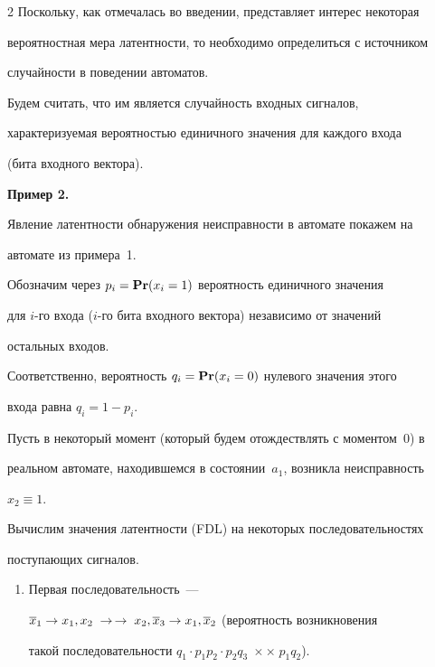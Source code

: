 \begin{multicols}{2}
Поскольку, как отмечалась во введении, представляет интерес некоторая


вероятностная мера латентности, то необходимо определиться с источником


случайности в поведении автоматов.


Будем считать, что им является случайность входных сигналов,


характеризуемая вероятностью единичного значения для каждого входа


(бита входного век\-тора).





\medskip





\noindent


{\bf Пример 2.}


Явление латентности обнаружения неисправности в автомате покажем на


автомате из примера~1.





Обозначим через $p_i={\bf Pr}(x_i=1)$ вероятность единичного значения


для $i$-го входа ($i$-го бита входного вектора) независимо от значений


остальных входов.


Соответственно, вероятность $q_i={\bf Pr}(x_i=0)$ нулевого значения этого


входа равна $q_i=1-p_i$.





 Пусть в некоторый момент (который будем отож\-дествлять с моментом~0) в


реальном автомате, находившемся в со\-сто\-янии~$a_1$, возникла неисправность


$x_2 \equiv 1$.


Вычислим значения латентности (FDL) на некоторых последовательностях


поступающих сигналов.


\begin{enumerate}[(1)]


\item Первая последовательность~---


$\overline x_1 \to x_1,x_2\; \to$\linebreak $\to\; x_2,\overline x_3 \to x_1,\overline x_2$ (вероятность возникновения


такой последовательности $q_1 \cdot p_1 p_2 \cdot p_2 q_3\; \times$\linebreak $\times\; p_1 q_2$).



\end{enumerate}
\end{multicols}
